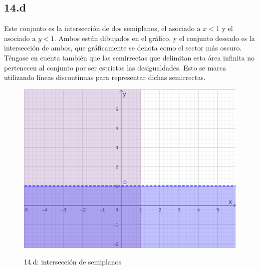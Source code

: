 \documentclass{article}
\begin{document}
\subsection*{14.d}
\label{subsec:14.d}

Este conjunto es la intersección de dos semiplanos, el asociado a $x < 1$ y el asociado a $y < 1$. Ambos están dibujados en el gráfico, y el conjunto deseado es la intersección de ambos, que gráficamente se denota como el sector más oscuro. Téngase en cuenta también que las semirrectas que delimitan esta área infinita no pertenecen al conjunto por ser estrictas las desigualdades. Esto se marca utilizando líneas discontinuas para representar dichas semirrectas.

\newpage

\begin{figure}[ht]
\caption{14.d: intersección de semiplanos}
\includegraphics[scale=0.8]{../img/guide_00/ex_14d.png} 
\centering
\label{fig:14d}
\end{figure}
\end{document}
